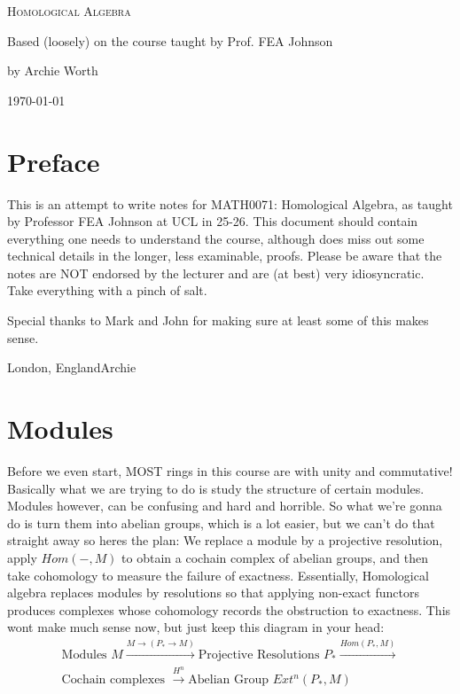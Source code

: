 \documentclass[12pt]{book}
\theoremstyle{definition}
\begin{document}
\begin{titlepage}
    \centering
    \vspace*{3cm}
    {\scshape\Huge Homological Algebra \par}
    \vspace{1.5cm}
    {\Large Based (loosely) on the course taught by Prof. FEA Johnson \par}
    \vspace{2cm}
    {\Large by Archie Worth \par}
    \vfill
    {\large \today\par}
\end{titlepage}

\chapter*{Preface}
\vspace{1cm}
This is an attempt to write notes for MATH0071: Homological Algebra, as taught by Professor FEA Johnson at UCL in 25-26. This document should contain everything one needs to understand the course, although does miss out some technical details in the longer, less examinable, proofs. Please be aware that the notes are NOT endorsed by the lecturer and are (at best) very idiosyncratic. Take everything with a pinch of salt. \vspace{1cm}


\noindent Special thanks to Mark and John for making sure at least some of this makes sense. \vspace{1cm }


\noindent London, England\hfill Archie 

\tableofcontents
\newpage

\chapter{Modules}
Before we even start, MOST rings in this course are with unity and commutative! Basically what we are trying to do is study the structure of certain modules. Modules however, can be confusing and hard and horrible. So what we're gonna do is turn them into abelian groups, which is a lot easier, but we can't do that straight away so heres the plan: We replace a module by a projective resolution, apply $Hom(-, M)$ to obtain a cochain complex of abelian groups, and then take cohomology to measure the failure of exactness. Essentially, Homological algebra replaces modules by resolutions so that applying non-exact functors produces complexes whose cohomology records the obstruction to exactness. This wont make much sense now, but just keep this diagram in your head: 
\begin{align*}
    \text{Modules } M \xrightarrow{M \rightarrow(P_* \rightarrow M)} \text{Projective Resolutions } P_* \xrightarrow{Hom(P_*, M)} \\\text{Cochain complexes } \xrightarrow{H^n}  \text{Abelian Group } Ext^n(P_*, M)
\end{align*}
\end{document}
